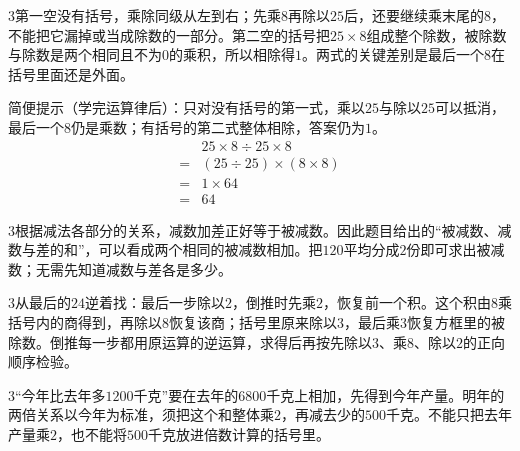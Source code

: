 \documentclass[multi=snippet,border={5bp 20bp 5bp 5bp}]{standalone}
\newenvironment{snippet}[3]{\begin{minipage}{#1bp}\color{answerred}\fontsize{#2}{#3}\selectfont\raggedright}{\end{minipage}}
\begin{document}
\begin{snippet}{505}{11.5}{14}\begin{multicols}{3}\raggedcolumns 第一空没有括号，乘除同级从左到右；先乘\(8\)\allowbreak 再除以\(25\)\allowbreak 后，还要继续乘末尾的\(8\)\allowbreak ，不能把它漏掉或当成除数的一部分。第二空的括号把\(25\times8\)\allowbreak 组成整个除数，被除数与除数是两个相同且不为\(0\)\allowbreak 的乘积，所以相除得\(1\)\allowbreak 。两式的关键差别是最后一个\(8\)\allowbreak 在括号里面还是外面。\par 简便提示（学完运算律后）：只对没有括号的第一式，乘以\(25\)\allowbreak 与除以\(25\)\allowbreak 可以抵消，最后一个\(8\)\allowbreak 仍是乘数；有括号的第二式整体相除，答案仍为\(1\)\allowbreak 。\[\begin{aligned}&25\times8\div25\times8\\={}&(25\div25)\times(8\times8)\\={}&1\times64\\={}&64\end{aligned}\]\end{multicols}\end{snippet}
\begin{snippet}{505}{11.5}{14}\begin{multicols}{3}\raggedcolumns 根据减法各部分的关系，减数加差正好等于被减数。因此题目给出的“被减数、减数与差的和”，可以看成两个相同的被减数相加。把\(120\)\allowbreak 平均分成\(2\)\allowbreak 份即可求出被减数；无需先知道减数与差各是多少。\end{multicols}\end{snippet}
\begin{snippet}{505}{11.5}{14}\begin{multicols}{3}\raggedcolumns 从最后的\(24\)\allowbreak 逆着找：最后一步除以\(2\)\allowbreak ，倒推时先乘\(2\)\allowbreak ，恢复前一个积。这个积由\(8\)\allowbreak 乘括号内的商得到，再除以\(8\)\allowbreak 恢复该商；括号里原来除以\(3\)\allowbreak ，最后乘\(3\)\allowbreak 恢复方框里的被除数。倒推每一步都用原运算的逆运算，求得后再按先除以\(3\)\allowbreak 、乘\(8\)\allowbreak 、除以\(2\)\allowbreak 的正向顺序检验。\end{multicols}\end{snippet}
\begin{snippet}{505}{11.5}{14}\begin{multicols}{3}\raggedcolumns “今年比去年多\(1200\)\allowbreak 千克”要在去年的\(6800\)\allowbreak 千克上相加，先得到今年产量。明年的两倍关系以今年为标准，须把这个和整体乘\(2\)\allowbreak ，再减去少的\(500\)\allowbreak 千克。不能只把去年产量乘\(2\)\allowbreak ，也不能将\(500\)\allowbreak 千克放进倍数计算的括号里。\end{multicols}\end{snippet}
\end{document}
